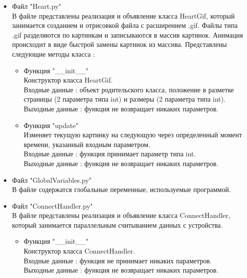 \documentclass[a4document]{article}
\begin{document}
{\begin{itemize}
    \item Файл "Heart.py" \\ 
        В файле представлены реализация и объявление класса HeartGif, который занимается созданием и отрисовкой файла 
        с расширением .gif. Файлы типа .gif разделяются по картинкам и записываются в массив картинок.
        Анимация происходит в виде быстрой замены картинок из массива.
        Представлены следующие методы класса :
        \begin{itemize}
            \item Функция "\_\_init\_\_" \\
                Конструктор класса HeartGif.\\
                Входные данные : объект родительского класса, положение в разметке страницы (2 параметра типа int) и размеры 
                (2 параметра типа int). \\ 
                Выходные данные : функция не возвращает никаких параметров.
            \item Функция "update" \\
                Изменяет текущую картинку на следующую через определенный момент времени, указанный входным параметром.\\
                Входные данные : функция принимает параметр типа int.\\
                Выходные данные : функция не возвращает никаких параметров.
        \end{itemize}
        
    \item Файл "GlobalVariables.py" \\ 
        В файле содержатся глобальные переменные, используемые программой.
        
    \item Файл "ConnectHandler.py" \\
        В файле представлены реализация и объявление класса ConnectHandler, который занимается параллельным считыванием
        данных с устройства.
        
        
        \begin{itemize}
            \item Функция "\_\_init\_\_" \\
                Конструктор класса ConnectHandler.\\
                Входные данные : функция не принимает никаких параметров. \\ 
                Выходные данные : функция не возвращает никаких параметров.
                

\end{itemize}
\end{itemize}}
\end{document}

